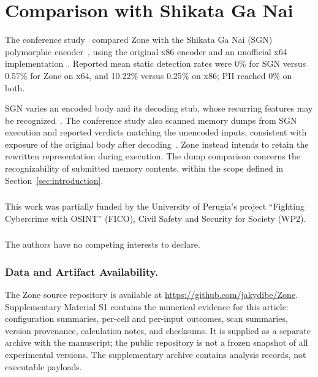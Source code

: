 \documentclass[runningheads]{llncs}
\begin{document}
\section{Comparison with Shikata Ga Nai}\label{sec:comparison}
The conference study~\cite{zone_secrypt_2026} compared Zone with the
Shikata Ga Nai (SGN) polymorphic encoder~\cite{sgnarticle}, using the
original x86 encoder and an unofficial x64 implementation~\cite{sgn64}.
Reported mean static detection rates were 0\% for SGN versus 0.57\% for
Zone on x64, and 10.22\% versus 0.25\% on x86; PII reached 0\% on both.

SGN varies an encoded body and its decoding stub, whose recurring
features may be recognized~\cite{sgnstrong}. The conference study also
scanned memory dumps from SGN execution and reported verdicts matching
the unencoded inputs, consistent with exposure of the original body after
decoding~\cite{codeExtraction}. Zone instead intends to retain the
rewritten representation during execution. The dump comparison concerns
the recognizability of submitted memory contents, within the scope
defined in Section~\ref{sec:introduction}.







\clearpage



\begin{credits}
\subsubsection{\ackname}
This work was partially funded by the University of Perugia's project ``Fighting Cybercrime with OSINT'' (FICO), Civil Safety and Security for Society (WP2).

\subsubsection{\discintname}
The authors have no competing interests to declare.

\subsubsection{Data and Artifact Availability.}
The Zone source repository is available at
\url{https://github.com/jakydibe/Zone}. Supplementary Material S1 contains
the numerical evidence for this article: configuration summaries,
per-cell and per-input outcomes, scan summaries, version provenance,
calculation notes, and checksums. It is supplied as a separate archive
with the manuscript; the public repository is not a frozen snapshot of
all experimental versions. The supplementary archive contains analysis
records, not executable payloads.

\end{credits}



\end{document}
